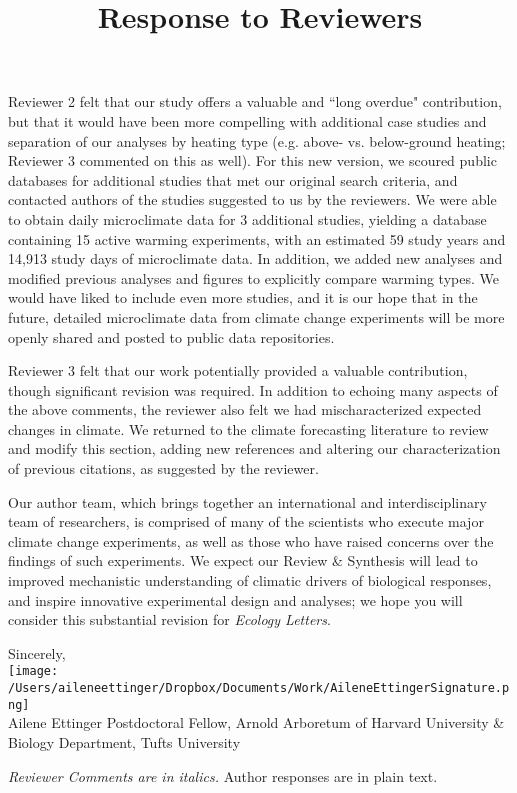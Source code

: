 \documentclass[11pt,a4paper]{letter}
\begin{document}
\begin{letter}{}
Reviewer 2 felt that our study offers a valuable and ``long overdue" contribution, but that it would have been more compelling with additional case studies and separation of our analyses by heating type (e.g. above- vs. below-ground heating; Reviewer 3 commented on this as well). For this new version, we scoured public databases for additional studies that met our original search criteria, and contacted authors of the studies suggested to us by the reviewers. We were able to obtain daily microclimate data for 3 additional studies, yielding a database containing 15 active warming experiments, with an estimated 59 study years and 14,913 study days of microclimate data. In addition, we added new analyses and modified previous analyses and figures to explicitly compare warming types.  We would have liked to include even more studies, and it is our hope that in the future, detailed microclimate data from climate change experiments will be more openly shared and posted to public data repositories. 

Reviewer 3 felt that our work potentially provided a valuable contribution, though significant revision was required.  In addition to echoing many aspects of the above comments, the reviewer also felt we had mischaracterized expected changes in climate. We returned to the climate forecasting literature to review and modify this section, adding new references and altering our characterization of previous citations, as suggested by the reviewer. 

Our author team, which brings together an international and interdisciplinary team of researchers, is comprised of many of the scientists who execute major climate change experiments, as well as those who have raised concerns over the findings of such experiments.  We expect our Review \& Synthesis will lead to improved mechanistic understanding of climatic drivers of biological responses, and inspire innovative experimental design and analyses; we hope you will consider this substantial revision for \emph{Ecology Letters}.

Sincerely,\\

\texttt{[image: /Users/aileneettinger/Dropbox/Documents/Work/AileneEttingerSignature.png]} \\
Ailene Ettinger
Postdoctoral Fellow, Arnold Arboretum of Harvard University \& Biology Department, Tufts University


\clearpage
\title{Response to Reviewers}
 \emph{Reviewer Comments are in italics.} Author responses are in plain text.


\end{letter}
\end{document}
